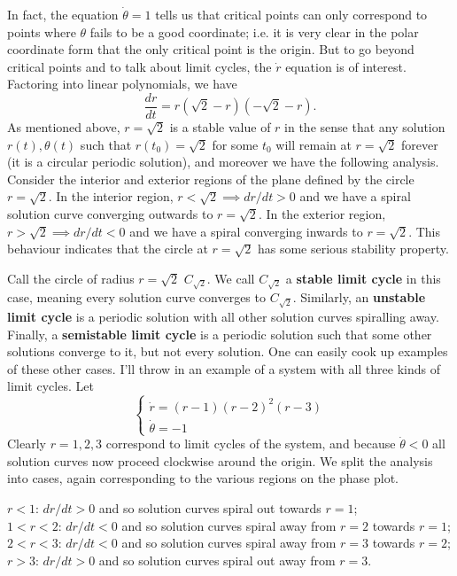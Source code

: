 \documentclass[11pt, letterpaper, oneside]{article}     %
\numberwithin{equation}{subsection}
\theoremstyle{definition}
\numberwithin{theorem}{section}
\theoremstyle{remark}
\begin{document}
\begin{enumerate}
  In fact, the equation $\dot\theta = 1$ tells us that critical points can only correspond to points where $\theta$ fails to be a good coordinate; i.e. it is very clear in the polar coordinate form that the only critical point is the origin. But to go beyond critical points and to talk about limit cycles, the $\dot r$ equation is of interest. Factoring into linear polynomials, we have
  \begin{equation}
    \frac{dr}{dt} = r(\sqrt 2 - r)(-\sqrt{2} -r).
  \end{equation}
  As mentioned above, $r = \sqrt{2}$ is a stable value of $r$ in the sense that any solution $r(t),\theta(t)$ such that $r(t_0) = \sqrt{2}$ for some $t_0$ will remain at $r = \sqrt{2}$ forever (it is a circular periodic solution), and moreover we have the following analysis. Consider the interior and exterior regions of the plane defined by the circle $r = \sqrt{2}$. In the interior region, $r < \sqrt{2} \implies dr/dt > 0$ and we have a spiral solution curve converging outwards to $r = \sqrt{2}$. In the exterior region, $r > \sqrt{2} \implies dr/dt < 0$ and we have a spiral converging inwards to $r = \sqrt{2}$. This behaviour indicates that the circle at $r = \sqrt{2}$ has some serious stability property.

  Call the circle of radius $r = \sqrt{2}$ $C_{\sqrt{2}}$. We call $C_{\sqrt{2}}$ a \textbf{stable limit cycle} in this case, meaning every solution curve converges to $C_{\sqrt{2}}$. Similarly, an \textbf{unstable limit cycle} is a periodic solution with all other solution curves spiralling away. Finally, a \textbf{semistable limit cycle} is a periodic solution such that some other solutions converge to it, but not every solution. One can easily cook up examples of these other cases. I'll throw in an example of a system with all three kinds of limit cycles. Let
  \begin{equation}
    \begin{cases}
      \dot r = (r-1)(r-2)^2(r-3)\\
      \dot \theta = -1
    \end{cases}
  \end{equation}
  Clearly $r = 1,2,3$ correspond to limit cycles of the system, and because $\dot\theta < 0$ all solution curves now proceed clockwise around the origin. We split the analysis into cases, again corresponding to the various regions on the phase plot.

  \underline{$r < 1$}: $dr/dt > 0$ and so solution curves spiral out towards $r = 1$;\\
  \underline{$1 < r < 2$}: $dr/dt < 0$ and so solution curves spiral away from $r=2$ towards $r = 1$;\\
  \underline{$2 < r < 3$}: $dr/dt < 0$ and so solution curves spiral away from $r=3$ towards $r = 2$;\\
  \underline{$r > 3$}: $dr/dt > 0$ and so solution curves spiral out away from $r = 3$.


\end{enumerate}
\end{document}
